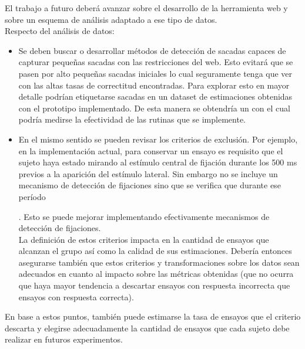 El trabajo a futuro deberá avanzar sobre el desarrollo de la herramienta web y
sobre un esquema de análisis adaptado a ese tipo de datos. \\
Respecto del análisis de datos: 
\begin{itemize}
  \item
    Se deben buscar o desarrollar métodos de detección de sacadas capaces de
    capturar pequeñas sacadas con las restricciones del \eyetracking web.
    Esto evitará que se pasen por alto pequeñas sacadas iniciales lo cual
    seguramente tenga que ver con las altas tasas de correctitud encontradas.
    Para explorar esto en mayor detalle podrían etiquetarse sacadas en un
    dataset de estimaciones obtenidas con el prototipo implementado.
    De esta manera se obtendría un \groundtruth con el cual podría medirse la
    efectividad de las rutinas que se implemente.
 
  \item
    En el mismo sentido se pueden revisar los criterios de exclusión.
    Por ejemplo, en la implementación actual, para conservar un ensayo es
    requisito que el sujeto haya estado mirando al estímulo central de fijación
    durante los 500 ms previos a la aparición del estímulo lateral.
    Sin embargo no se incluye un mecanismo de detección de fijaciones sino que
    se verifica que durante ese período .
    Esto se puede mejorar implementando efectivamente mecanismos de detección
    de fijaciones. \\
    La definición de estos criterios impacta en la cantidad de ensayos que
    alcanzan el grupo \inlier así como la calidad de sus estimaciones.
    Debería entonces asegurarse también que estos criterios y transformaciones
    sobre los datos sean adecuados en cuanto al impacto sobre las métricas
    obtenidas (\eg que no ocurra que haya mayor tendencia a descartar ensayos
    con respuesta incorrecta que ensayos con respuesta correcta).
\end{itemize}

En base a estos puntos, también puede estimarse la tasa de ensayos que el
criterio descarta y elegirse adecuadamente la cantidad de ensayos que cada
sujeto debe realizar en futuros experimentos.

